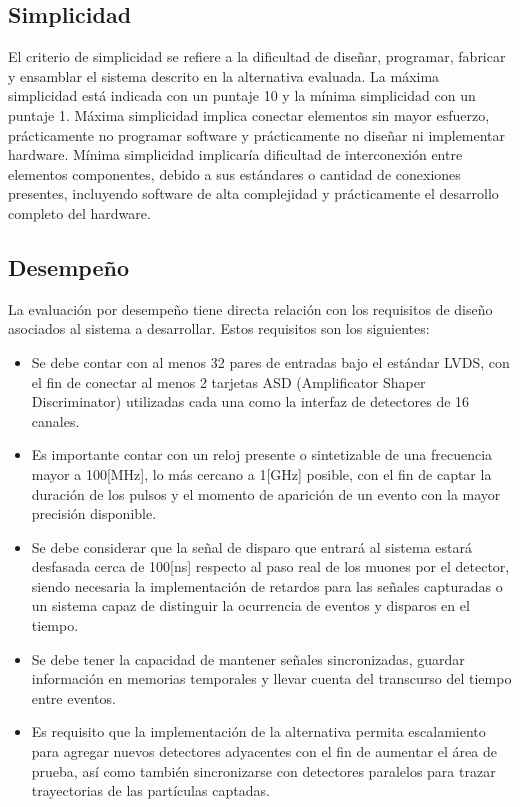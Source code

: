 \subsection*{Simplicidad}
\par El criterio de simplicidad se refiere a la dificultad de diseñar, programar, fabricar y ensamblar el sistema descrito en la alternativa evaluada. La máxima simplicidad está indicada con un puntaje 10 y la mínima simplicidad con un puntaje 1. Máxima simplicidad implica conectar elementos sin mayor esfuerzo, prácticamente no programar software y prácticamente no diseñar ni implementar hardware. Mínima simplicidad implicaría dificultad de interconexión entre elementos componentes, debido a sus estándares o cantidad de conexiones presentes, incluyendo software de alta complejidad y prácticamente el desarrollo completo del hardware.

\subsection*{Desempeño}
La evaluación por desempeño tiene directa relación con los requisitos de diseño asociados al sistema a desarrollar. Estos requisitos son los siguientes:

\begin{itemize}
    \item Se debe contar con al menos 32 pares de entradas bajo el estándar LVDS, con el fin de conectar al menos 2 tarjetas ASD (Amplificator Shaper Discriminator) utilizadas cada una como la interfaz de detectores de 16 canales.
    \item Es importante contar con un reloj presente o sintetizable de una frecuencia mayor a 100[MHz], lo más cercano a 1[GHz] posible, con el fin de captar la duración de los pulsos y el momento de aparición de un evento con la mayor precisión disponible.
    \item Se debe considerar que la señal de disparo que entrará al sistema estará desfasada cerca de 100[ns] respecto al paso real de los muones por el detector, siendo necesaria la implementación de retardos para las señales capturadas o un sistema capaz de distinguir la ocurrencia de eventos y disparos en el tiempo.
    \item  Se debe tener la capacidad de mantener señales sincronizadas, guardar información en memorias temporales y llevar cuenta del transcurso del tiempo entre eventos.
    \item Es requisito que la implementación de la alternativa permita escalamiento para agregar nuevos detectores adyacentes con el fin de aumentar el área de prueba, así como también sincronizarse con detectores paralelos para trazar trayectorias de las partículas captadas.
\end{itemize}

